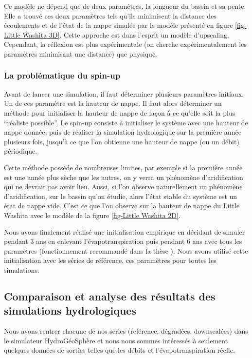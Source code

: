 \documentclass[a4paper,11pt]{article}
\numberwithin{equation}{section}
\begin{document}
Ce modèle ne dépend que de deux paramètres, la longueur du bassin et sa pente. Elle a trouvé ces deux paramètres tels qu'ils minimisent la distance des écoulements et de l'état de la nappe simulée par le modèle présenté en figure \ref{fig-Little Washita 3D}. Cette approche est dans l'esprit un modèle d'upscaling. Cependant, la réflexion est plus expérimentale (on cherche expérimentalement les paramètres minimisant une distance) que physique.

\subsubsection{La problématique du spin-up}

Avant de lancer une simulation, il faut déterminer plusieurs paramètres initiaux. Un de ces paramètre est la hauteur de nappe. Il faut alors déterminer un méthode pour initialiser la hauteur de nappe de façon à ce qu'elle soit la plus ``réaliste possible''. Le spin-up consiste à initialiser le système avec une hauteur de nappe donnée, puis de réaliser la simulation hydrologique sur la première année plusieurs fois, jusqu'à ce que l'on obtienne une hauteur de nappe (ou un débit) périodique. 

Cette méthode possède de nombreuses limites, par exemple si la première année est une année plus sèche que les autres, on y verra un phénomène d'aridification qui ne devrait pas avoir lieu. Aussi, si l'on observe naturellement un phénomène d'aridification, sur le bassin qu'on étudie, alors l'état stable du système est un état de nappe vide. C'est ce que l'on observe sur la hauteur de nappe du Little Washita avec le modèle de la figure \ref{fig-Little Washita 2D}.

Nous avons finalement réalisé une initialisation empirique en décidant de simuler pendant 3 ans en enlevant l'évapotranspiration puis pendant 6 ans avec tous les paramètres (fonctionnement recommandé dans la thèse \cite{maquin2016developpement}). Nous avons utilisé cette initialisation avec les séries de référence, ces paramètres pour toutes les simulations. 

\subsection{Comparaison et analyse des résultats des simulations hydrologiques}

Nous avons rentrer chacune de nos séries (référence, dégradées, downscalées) dans le simulateur HydroGéoSphère et nous nous sommes intéressés à seulement quelques données de sorties telles que les débits et l'évapotranspiration réelle.
\end{document}
